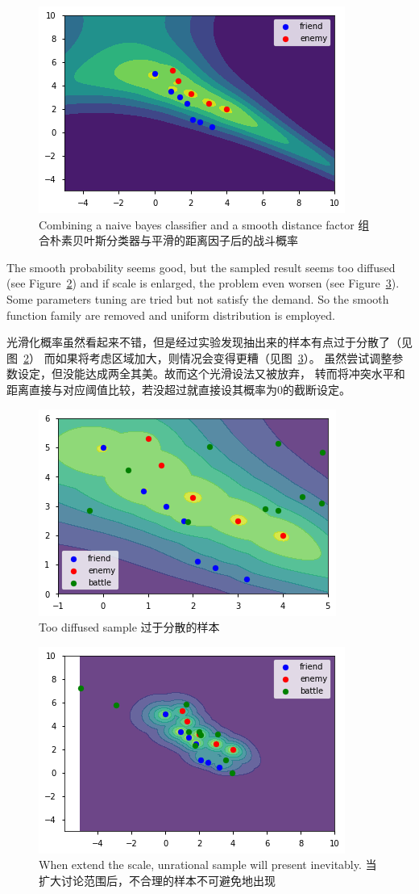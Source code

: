 \documentclass{article}
\begin{document}
\begin{figure}[ht]
\includegraphics[width=0.6\linewidth]{comb1.png}
\caption{Combining a naive bayes classifier and a smooth distance factor
组合朴素贝叶斯分类器与平滑的距离因子后的战斗概率}
\label{fig:combOne}
\end{figure}

The smooth probability seems good, but the sampled result seems too diffused 
(see Figure~\ref{fig:combTwo}) and if scale is enlarged, 
the problem even worsen (see Figure~\ref{fig:combThree}).
Some parameters tuning are tried but not satisfy the demand. 
So the smooth function family are removed and uniform distribution is employed. 

光滑化概率虽然看起来不错，但是经过实验发现抽出来的样本有点过于分散了（见图~\ref{fig:combTwo}）
而如果将考虑区域加大，则情况会变得更糟（见图~\ref{fig:combThree}）。
虽然尝试调整参数设定，但没能达成两全其美。故而这个光滑设法又被放弃，
转而将冲突水平和距离直接与对应阈值比较，若没超过就直接设其概率为0的截断设定。

\begin{figure}[ht]
\includegraphics[width=0.6\linewidth]{comb2.png}
\caption{Too diffused sample 过于分散的样本}
\label{fig:combTwo}
\end{figure}

\begin{figure}[ht]
\includegraphics[width=0.6\linewidth]{comb4.png}
\caption{When extend the scale, unrational sample will present inevitably.
当扩大讨论范围后，不合理的样本不可避免地出现}
\label{fig:combThree}
\end{figure}
\end{document}

